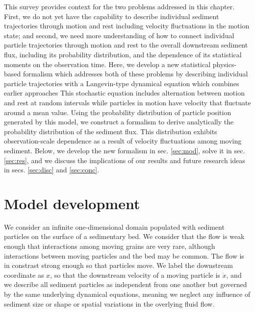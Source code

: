 This survey provides context for the two problems addressed in this chapter. First, we do not yet have the capability to describe individual sediment trajectories through motion and rest including velocity fluctuations in the motion state; and second, we need more understanding of how to connect individual particle trajectories through motion and rest to the overall downstream sediment flux, including its probability distribution, and the dependence of its statistical moments on the observation time.
Here, we develop a new statistical physics-based formalism which addresses both of these problems by describing individual particle trajectories with a Langevin-type dynamical equation which combines earlier approaches \citep{Fan2014,Ancey2014,Lisle1998,Lajeunesse2017}
This stochastic equation includes alternation between motion and rest at random intervals while particles in motion have velocity that fluctuate around a mean value.
Using the probability distribution of particle position generated by this model, we construct a formalism to derive analytically the probability distribution of the sediment flux. This distribution exhibits observation-scale dependence as a result of velocity fluctuations among moving sediment.
Below, we develop the new formalism in sec. \ref{sec:mod}, solve it in sec. \ref{sec:res}, and we discuss the implications of our results and future research ideas in secs. \ref{sec:disc} and \ref{sec:conc}.

\section{Model development \label{sec:mod}}
We consider an infinite one-dimensional domain populated with sediment particles on the surface of a sedimentary bed. We consider that the flow is weak enough that interactions among moving grains are very rare, although interactions between moving particles and the bed may be common. The flow is in constrast strong enough so that particles move.
We label the downstream coordinate as $x$, so that the downstream velocity of a moving particle is $\dot{x}$, and we describe all sediment particles as independent from one another but governed by the same underlying dynamical equations, meaning we neglect any influence of sediment size or shape or spatial variations in the overlying fluid flow.

